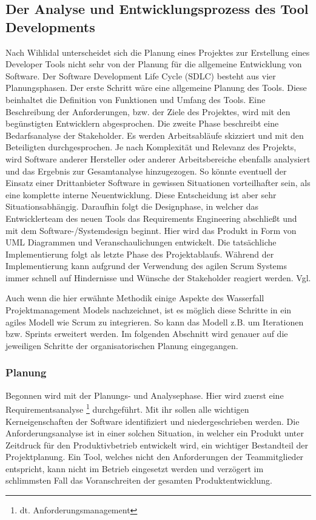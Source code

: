 \documentclass[pagesize, paper=a4, fontsize=12pt, titlepage=true, headings=small, headnosepline, abstractoff, liststotoc, nochapterprefix, plainheadsepline, twoside]{scrreprt}
\begin{document}
\subsection{Der Analyse und Entwicklungsprozess des Tool Developments}
Nach Wihlidal unterscheidet sich die Planung eines Projektes zur Erstellung eines Developer Tools nicht sehr von der Planung für die allgemeine Entwicklung von Software. Der Software Development Life Cycle (SDLC) besteht aus vier Planungsphasen. Der erste Schritt wäre eine allgemeine Planung des Tools. Diese beinhaltet die Definition von Funktionen und Umfang des Tools. Eine Beschreibung der Anforderungen, bzw. der Ziele des Projektes, wird mit den begünstigten Entwicklern abgesprochen. Die zweite Phase beschreibt eine Bedarfsanalyse der Stakeholder. Es werden Arbeitsabläufe skizziert und mit den Beteiligten durchgesprochen. Je nach Komplexität und Relevanz des Projekts, wird Software anderer Hersteller oder anderer Arbeitsbereiche ebenfalls analysiert und das Ergebnis zur Gesamtanalyse hinzugezogen. So könnte eventuell der Einsatz einer Drittanbieter Software in gewissen Situationen vorteilhafter sein, als eine komplette interne Neuentwicklung. Diese Entscheidung ist aber sehr Situationsabhängig. Daraufhin folgt die Designphase, in welcher das Entwicklerteam des neuen Tools das Requirements Engineering abschließt und mit dem Software-/Systemdesign beginnt. Hier wird das Produkt in Form von UML Diagrammen und Veranschaulichungen entwickelt. Die tatsächliche Implementierung folgt als letzte Phase des Projektablaufs. Während der Implementierung kann aufgrund der Verwendung des agilen Scrum Systems immer schnell auf Hindernisse und Wünsche der Stakeholder reagiert werden. Vgl. \parencite[S. 37-40]{Wihlidal2006}

Auch wenn die hier erwähnte Methodik einige Aspekte des Wasserfall Projektmanagement Models nachzeichnet, ist es möglich diese Schritte in ein agiles Modell wie Scrum zu integrieren. So kann das Modell z.B. um Iterationen bzw. Sprints erweitert werden. Im folgenden Abschnitt wird genauer auf die jeweiligen Schritte der organisatorischen Planung eingegangen.

\subsubsection{Planung}
Begonnen wird mit der Planungs- und Analysephase. Hier wird zuerst eine Requirementsanalyse \footnote{dt. Anforderungsmanagement} durchgeführt. Mit ihr sollen alle wichtigen Kerneigenschaften der Software identifiziert und niedergeschrieben werden. Die Anforderungsanalyse ist in einer solchen Situation, in welcher ein Produkt unter Zeitdruck für den Produktivbetrieb entwickelt wird, ein wichtiger Bestandteil der Projektplanung. Ein Tool, welches nicht den Anforderungen der Teammitglieder entspricht, kann nicht im Betrieb eingesetzt werden und verzögert im schlimmsten Fall das Voranschreiten der gesamten Produktentwicklung.
\end{document}

